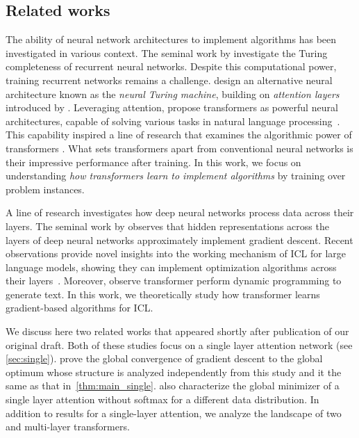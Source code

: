 \documentclass{article}
\begin{document}
\subsection{Related works}  

The ability of neural network architectures to implement algorithms has been investigated in various context. The seminal work by \cite{siegelmann1992computational} investigate the Turing completeness of recurrent neural networks. Despite this computational power, training recurrent networks remains a challenge.  \cite{graves2014neural} design an alternative neural architecture known as the \emph{neural Turing machine}, building on \emph{attention layers} introduced by \cite{hochreiter1997long}. Leveraging attention, \cite{vaswani2017attention} propose transformers as powerful neural architectures, capable of solving various tasks in natural language processing~\citep{bert}. This capability inspired a line of research that examines the algorithmic power of transformers \citep{perez2021attention,wei2022statistically,giannou2023looped,akyurek2022learning,olsson2022context}.    What sets transformers apart from conventional neural networks is their impressive performance after training. In this work, we focus on understanding \emph{how transformers learn to implement algorithms} by training over problem instances.

A line of research investigates how deep neural networks process data across their layers. The seminal work by \cite{jastrzebski2018residual} observes that hidden representations across the layers of deep neural  networks approximately implement gradient descent.  
Recent observations provide novel insights into the working mechanism of ICL for large language models, showing they can implement optimization algorithms across their layers~\citep{garg2022can,akyurek2022learning,von2022transformers}. Moreover, \citet{zhao2023transformers,allen2023physics} observe transformer perform dynamic programming to generate text.  
In this work, we theoretically study how transformer learns gradient-based algorithms for ICL.

 We discuss here two related works \citep{zhang2023trained,mahankali2023one} that appeared shortly after publication of our original draft. Both of these studies focus on a single layer attention network (see  \autoref{sec:single}). \cite{zhang2023trained} prove the global convergence of gradient descent to the global optimum whose structure is analyzed independently from this study and it the same as that in~\autoref{thm:main_single}. \cite{mahankali2023one} also characterize the global minimizer of a single layer attention without softmax for a different data distribution. In addition to results for a single-layer attention, we analyze the landscape of two and multi-layer transformers. 
\end{document}
